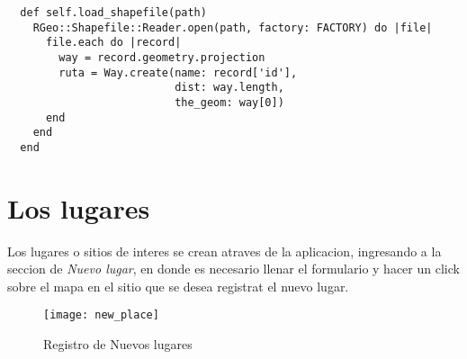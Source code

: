     \begin{center}
      \begin{verbatim}
  def self.load_shapefile(path)
    RGeo::Shapefile::Reader.open(path, factory: FACTORY) do |file|
      file.each do |record|
        way = record.geometry.projection
        ruta = Way.create(name: record['id'], 
                          dist: way.length,  
                          the_geom: way[0])
      end
    end
  end
      \end{verbatim}
    \end{center}

  \section{Los lugares} %
  \label{sec:los_lugares}
    Los lugares o sitios de interes se crean atraves de la aplicacion, ingresando a la seccion de \emph{Nuevo lugar}, en donde es necesario llenar el formulario y hacer un click sobre el mapa en el sitio que se desea registrat el nuevo lugar.

    \begin{figure}[!ht]
      \begin{center}
        \texttt{[image: new\_place]}
      \end{center}
      \caption{Registro de Nuevos lugares}
      \label{fig:new_place}
    \end{figure}
